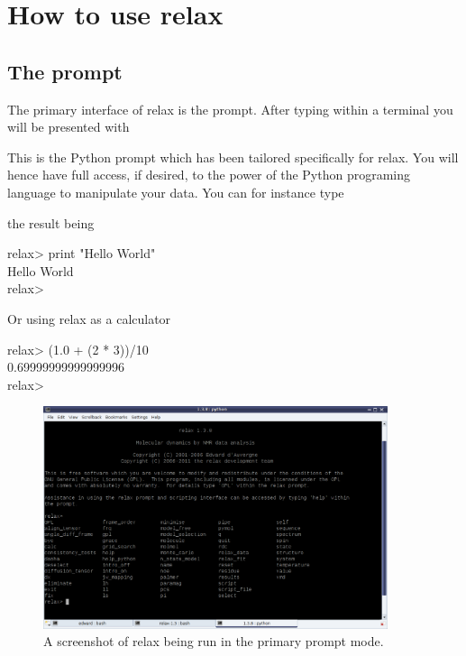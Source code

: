 
\section{How to use relax}



\subsection{The prompt}

The primary interface of relax is the prompt.  After typing  within a terminal you will be presented with


This is the Python prompt which has been tailored specifically for relax.  You will hence have full access, if desired, to the power of the Python programing language to manipulate your data.  You can for instance type


the result being

\begin{exampleenv}
relax> print "Hello World" \\
Hello World \\
relax>
\end{exampleenv}

Or using relax as a calculator

\begin{exampleenv}
relax> (1.0 + (2 * 3))/10 \\
0.69999999999999996 \\
relax>
\end{exampleenv}

\begin{figure}
\centerline{\includegraphics[width=0.9\textwidth, bb=14 14 861 561]{graphics/screenshots/relax_prompt_1_3_8}}
\caption[Prompt screenshot]{A screenshot of relax being run in the primary prompt mode.}\label{fig: relax prompt}
\end{figure}



